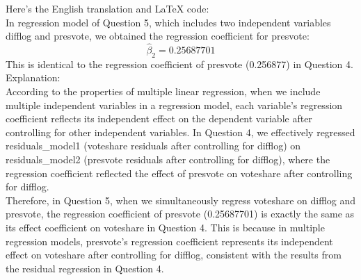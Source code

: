 \documentclass[12pt,letterpaper]{article}
\begin{document}
\begin{enumerate}
		\vspace{.5cm}
		Here's the English translation and LaTeX code:\\
		In regression model of Question 5, which includes two independent variables difflog and presvote, we obtained the regression coefficient for presvote:\\
		$$
		\hat{\beta}_2 = 0.25687701
		$$
		This is identical to the regression coefficient of presvote (0.256877) in Question 4.\\
		Explanation:\\
		According to the properties of multiple linear regression, when we include multiple independent variables in a regression model, each variable's regression coefficient reflects its independent effect on the dependent variable after controlling for other independent variables. In Question 4, we effectively regressed residuals\_model1 (voteshare residuals after controlling for difflog) on residuals\_model2 (presvote residuals after controlling for difflog), where the regression coefficient reflected the effect of presvote on voteshare after controlling for difflog.\\
		Therefore, in Question 5, when we simultaneously regress voteshare on difflog and presvote, the regression coefficient of presvote (0.25687701) is exactly the same as its effect coefficient on voteshare in Question 4. This is because in multiple regression models, presvote's regression coefficient represents its independent effect on voteshare after controlling for difflog, consistent with the results from the residual regression in Question 4.
		
	\end{enumerate}
\end{document}
